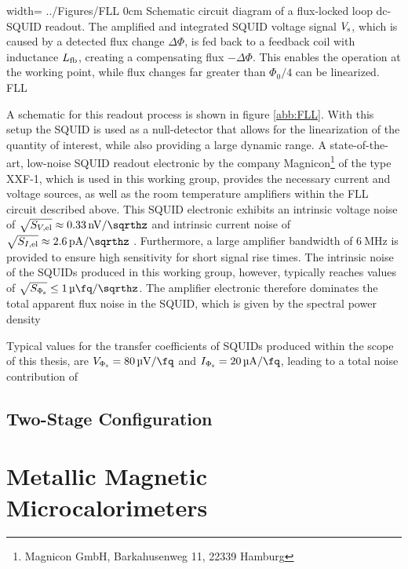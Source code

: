 {width=\textwidth}
{../Figures/FLL}
{0cm}
{Schematic circuit diagram of a flux-locked loop dc-SQUID readout. The amplified and integrated SQUID voltage signal $V_{\rm s}$, which is caused by a detected flux change $\Delta\Phi$, is fed back to a feedback coil with inductance $L_{\rm fb}$, creating a compensating flux $-\Delta\Phi$. This enables the operation at the working point, while flux changes far greater than $\Phi_0/4$ can be linearized.} 
{FLL}

A schematic for this readout process is shown in figure \ref{abb:FLL}.  With this setup the SQUID is used as a null-detector that allows for the linearization of the quantity of interest, while also providing a large dynamic range. A state-of-the-art, low-noise SQUID readout electronic by the company Magnicon\footnote{Magnicon GmbH, Barkahusenweg 11, 22339 Hamburg} of the type XXF-1, which is used in this working group, provides the necessary current and voltage sources, as well as the room temperature amplifiers within the FLL circuit described above. This SQUID electronic exhibits an intrinsic voltage noise of $\sqrt{S_{V\rm ,el}}\approx\qty{0.33}{\nV\per\sqrthz}$ and intrinsic current noise of $\sqrt{S_{I\rm ,el}}\approx\qty{2.6}{\pA\per\sqrthz}$ \cite{Drung2006}. Furthermore, a large amplifier bandwidth of $\qty{6}{\MHz}$ is provided to ensure high sensitivity for short signal rise times. The intrinsic noise of the SQUIDs produced in this working group, however, typically reaches values of $\sqrt{S_{\Phi_{\rm s}}}\leq\qty{1}{\micro\fq\per\sqrthz}$. The amplifier electronic therefore dominates the total apparent flux noise in the SQUID, which is given by the spectral power density


Typical values for the transfer coefficients of SQUIDs produced within the scope of this thesis, are $V_{\rm \Phi_s}=\qty{80}{\uV\per\fq}$ and $I_{\rm \Phi_s}=\qty{20}{\uA\per\fq}$, leading to a total noise contribution of  

\subsection{Two-Stage Configuration}

\section{Metallic Magnetic Microcalorimeters} \label{sec_MMC}

